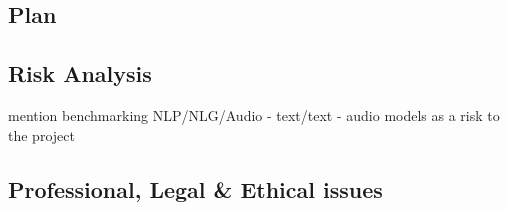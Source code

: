 \documentclass[../../D1.tex]{subfiles}
\begin{document}
\subsection{Plan}

\subsection{Risk Analysis}

mention benchmarking NLP/NLG/Audio - text/text - audio models as a risk to the project

\subsection{Professional, Legal \& Ethical issues}
\end{document}
